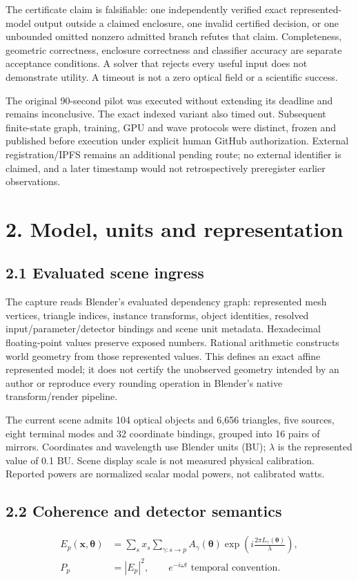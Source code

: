 \documentclass[11pt]{article}
\begin{document}
The certificate claim is falsifiable: one independently verified exact represented-model output outside a claimed enclosure, one invalid certified decision, or one unbounded omitted nonzero admitted branch refutes that claim. Completeness, geometric correctness, enclosure correctness and classifier accuracy are separate acceptance conditions. A solver that rejects every useful input does not demonstrate utility. A timeout is not a zero optical field or a scientific success.

The original 90-second pilot was executed without extending its deadline and remains inconclusive. The exact indexed variant also timed out. Subsequent finite-state graph, training, GPU and wave protocols were distinct, frozen and published before execution under explicit human GitHub authorization. External registration/IPFS remains an additional pending route; no external identifier is claimed, and a later timestamp would not retrospectively preregister earlier observations.

\section*{2. Model, units and representation}

\subsection*{2.1 Evaluated scene ingress}

The capture reads Blender's evaluated dependency graph: represented mesh vertices, triangle indices, instance transforms, object identities, resolved input/parameter/detector bindings and scene unit metadata. Hexadecimal floating-point values preserve exposed numbers. Rational arithmetic constructs world geometry from those represented values. This defines an exact affine represented model; it does not certify the unobserved geometry intended by an author or reproduce every rounding operation in Blender's native transform/render pipeline.

The current scene admits 104 optical objects and 6,656 triangles, five sources, eight terminal modes and 32 coordinate bindings, grouped into 16 pairs of mirrors. Coordinates and wavelength use Blender units (BU); $\lambda$ is the represented value of 0.1 BU. Scene display scale is not measured physical calibration. Reported powers are normalized scalar modal powers, not calibrated watts.

\subsection*{2.2 Coherence and detector semantics}
\begin{align}
 E_p(\mathbf{x},\boldsymbol{\theta})&=\sum_s x_s\sum_{\gamma:s\to p} A_{\gamma}(\boldsymbol{\theta})\exp\!\left(i\frac{2\pi L_{\gamma}(\boldsymbol{\theta})}{\lambda}\right),\\
 P_p&=|E_p|^2,\qquad e^{-i\omega t}\text{ temporal convention.}
\end{align}
\end{document}

